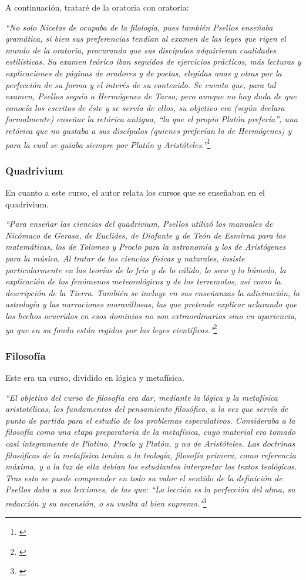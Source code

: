 A continuación, trataré de la oratoria con oratoria:

\textit{“No solo Nicetas de ocupaba de la filología, pues también Psellos 
enseñaba gramática, si bien sus preferencias tendían al examen de 
las leyes que rigen el mundo de la oratoria, procurando que sus discípulos 
adquirieran cualidades estilísticas. Su examen teórico iban seguidos 
de ejercicios prácticos, más lecturas y explicaciones de páginas 
de oradores y de poetas, elegidas unas y otras por la perfección de 
su forma y el interés de su contenido. Se cuenta que, para tal examen, 
Psellos seguía a Hermógenes de Tarso; pero aunque no hay duda de 
que conocía los escritos de éste y se servía de ellos, su objetivo era 
(según declara formalmente) enseñar la retórica antigua, 
“la que el propio Platón prefería”, una retórica que no gustaba a 
sus discípulos (quienes preferían la de Hermógenes) y para la cual 
se guiaba siempre por Platón y Aristóteles.”}\footnote{\cite[p.~163]{filosofia}}

\subsubsection{Quadrivium}
En cuanto a este curso, el autor relata los cursos 
que se enseñaban en el quadrivium.

\textit{“Para enseñar las ciencias del quadrivium, Psellos utilizó los 
manuales de Nicómaco de Gerasa, de Euclides, de Diofante y de 
Teón de Esmirna para las matemáticas, los de Tolomeo y Proclo para la 
astronomía y los de Aristógenes para la música. 
Al tratar de las ciencias físicas y naturales, insiste particularmente 
en las teorías de lo frío y de lo cálido, lo seco y lo húmedo, 
la explicación de los fenómenos meteorológicos y de los terremotos, 
así como la descripción de la Tierra. 
También se incluye en sus enseñanzas la adivinación, 
la astrología y las narraciones maravillosas, 
las que pretende explicar aclarando que los hechos ocurridos en esos 
dominios no son extraordinarios sino en apariencia, 
ya que en su fondo están regidos por las leyes científicas."}\footnote{\cite[p.~163]{filosofia}}

\subsubsection{Filosofía}
Este era un curso, dividido en lógica y metafísica.

\textit{“El objetivo del curso de filosofía era dar, mediante la lógica y 
la metafísica aristotélicas, los fundamentos del pensamiento 
filosófico, a la vez que servía de punto de partida para el 
estudio de los problemas especulativos. Consideraba a la filosofía 
como una etapa preparatoria de la metafísica, cuyo material era tomado 
casi íntegramente de Plotino, Proclo y Platón, y no de Aristóteles. 
Las doctrinas filosóficas de la metafísica tenían a la teología, 
filosofía primera, como referencia máxima, y a la luz de ella debían 
los estudiantes interpretar los textos teológicos. 
Tras esto se puede comprender en todo su valor el sentido de la 
definición de Psellos daba a sus lecciones, de las que: 
“La lección es la perfección del alma, su redacción y su ascensión, 
o su vuelta al bien supremo."}\footnote{\cite[pp.~164--165]{filosofia}}

